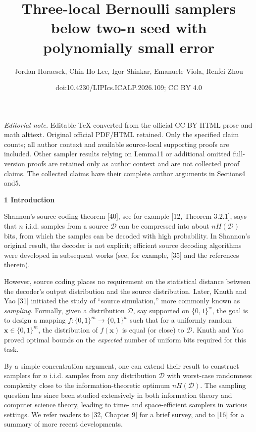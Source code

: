 \documentclass[10pt,a4paper]{article}
\title{Three-local Bernoulli samplers below two-n seed with polynomially small error}
\author{Jordan Horacsek, Chin Ho Lee, Igor Shinkar, Emanuele Viola, Renfei Zhou}
\date{doi:10.4230/LIPIcs.ICALP.2026.109; CC BY 4.0}
\begin{document}
\maketitle
\noindent\textit{Editorial note.} Editable TeX converted from the official CC BY HTML prose and math alttext. Original official PDF/HTML retained. Only the specified claim counts; all author context and available source-local supporting proofs are included. Other sampler results relying on Lemma11 or additional omitted full-version proofs are retained only as author context and are not collected proof claims. The collected claims have their complete author arguments in Sections4 and5.\par\medskip


\par\medskip\noindent\textbf{
1 Introduction}\par




Shannon’s source coding theorem [40], see for example [12, Theorem 3.2.1], says that $n$ i.i.d. samples from a source $\mathcal{D}$ can be compressed into about $nH(\mathcal{D})$ bits, from which the samples can be decoded with high probability. In Shannon’s original result, the decoder is not explicit; efficient source decoding algorithms were developed in subsequent works (see, for example, [35] and the references therein).\par




However, source coding places no requirement on the statistical distance between the decoder’s output distribution and the source distribution.
Later, Knuth and Yao [31] initiated the study of “source simulation,” more commonly known as \emph{sampling}.
Formally, given a distribution $\mathcal{D}$, say supported on $\{0,1\}^{w}$, the goal is to design a mapping $f\colon\{0,1\}^{m}\to\{0,1\}^{w}$ such that for a uniformly random $\boldsymbol{x}\in\{0,1\}^{m}$, the distribution of $f(\boldsymbol{x})$ is equal (or close) to $\mathcal{D}$.
Knuth and Yao proved optimal bounds on the \emph{expected} number of uniform bits required for this task.\par




By a simple concentration argument, one can extend their result to construct samplers for $n$ i.i.d. samples from any distribution $\mathcal{D}$ with worst-case randomness complexity close to the information-theoretic optimum $nH(\mathcal{D})$.
The sampling question has since been studied extensively in both information theory and computer science theory, leading to time- and space-efficient samplers in various settings.
We refer readers to [32, Chapter 9] for a brief survey, and to [16] for a summary of more recent developments.\par
\end{document}
